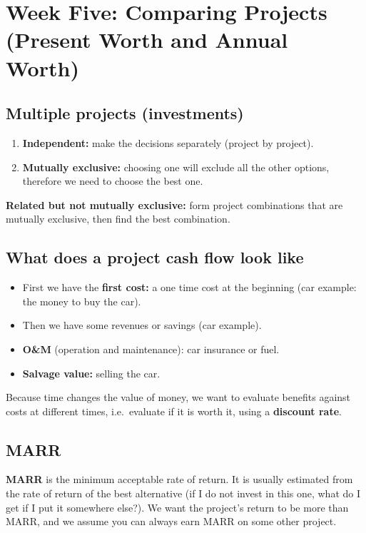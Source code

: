 \documentclass[11pt]{article}
\newcommand{\term}[1]{\textbf{\textcolor{cTerm}{#1}}}
\begin{document}
\section{Week Five: Comparing Projects (Present Worth and Annual Worth)}


\subsection*{Multiple projects (investments)}
\begin{enumerate}[nosep]
  \item \term{Independent:} make the decisions separately (project by project).
  \item \term{Mutually exclusive:} choosing one will exclude all the other
        options, therefore we need to choose the best one.
\end{enumerate}
\term{Related but not mutually exclusive:} form project combinations that are
mutually exclusive, then find the best combination.

\subsection*{What does a project cash flow look like}
\begin{itemize}[nosep]
  \item First we have the \term{first cost:} a one time cost at the beginning
        (car example: the money to buy the car).
  \item Then we have some revenues or savings (car example).
  \item \term{O\&M} (operation and maintenance): car insurance or fuel.
  \item \term{Salvage value:} selling the car.
\end{itemize}

Because time changes the value of money, we want to evaluate benefits against
costs at different times, i.e.\ evaluate if it is worth it, using a
\term{discount rate}.

\subsection*{MARR}
\term{MARR} is the minimum acceptable rate of return. It is usually estimated
from the rate of return of the best alternative (if I do not invest in this one,
what do I get if I put it somewhere else?). We want the project's return to be
more than MARR, and we assume you can always earn MARR on some other project.
\end{document}
